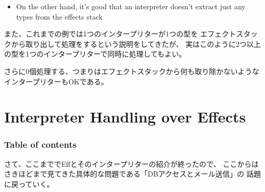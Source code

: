 \begin{frame}
\begin{itemize}
    \item<+-> On the other hand, it's good that an interpreter doesn't extract just any types from the effects stack
    \begin{center}
    \end{center}
  \end{itemize}

  \begin{notes}
    \item また、これまでの例では1つのインタープリターが1つの型を
    エフェクトスタックから取り出して処理をするという説明をしてきたが、
    実はこのように2つ以上の型を1つのインタープリターで同時に処理してもよい。

    \item さらに0個処理する、つまりはエフェクトスタックから何も取り除かないような
    インタープリターもOKである。
  \end{notes}
\end{frame}

\section{Interpreter Handling over Effects}

\begin{frame}
  \frametitle{Table of contents}
  \tableofcontents[currentsection]

  \begin{notes}
    \item さて、ここまででEffとそのインタープリターの紹介が終ったので、
    ここからはさきほどまで見てきた具体的な問題である「DBアクセスとメール送信」の
    話題に戻っていく。
  \end{notes}
\end{frame}

